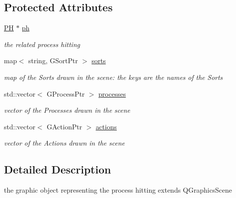 \subsection*{Protected Attributes}
\begin{DoxyCompactItemize}
\item 
\hypertarget{classPHScene_a332655cec4c6cca3153ffc3ee14eb465}{\hyperlink{classPH}{P\+H} $\ast$ \hyperlink{classPHScene_a332655cec4c6cca3153ffc3ee14eb465}{ph}}\label{classPHScene_a332655cec4c6cca3153ffc3ee14eb465}

\begin{DoxyCompactList}\small\item\em the related process hitting \end{DoxyCompactList}\item 
\hypertarget{classPHScene_a664d48bb0ae4f95df04e7a939855cae5}{map$<$ string, G\+Sort\+Ptr $>$ \hyperlink{classPHScene_a664d48bb0ae4f95df04e7a939855cae5}{sorts}}\label{classPHScene_a664d48bb0ae4f95df04e7a939855cae5}

\begin{DoxyCompactList}\small\item\em map of the Sorts drawn in the scene\+: the keys are the names of the Sorts \end{DoxyCompactList}\item 
\hypertarget{classPHScene_a392d190fc16531af5049727766582bed}{std\+::vector$<$ G\+Process\+Ptr $>$ \hyperlink{classPHScene_a392d190fc16531af5049727766582bed}{processes}}\label{classPHScene_a392d190fc16531af5049727766582bed}

\begin{DoxyCompactList}\small\item\em vector of the Processes drawn in the scene \end{DoxyCompactList}\item 
\hypertarget{classPHScene_a5802a1a674ffd883d3bf8403399365fb}{std\+::vector$<$ G\+Action\+Ptr $>$ \hyperlink{classPHScene_a5802a1a674ffd883d3bf8403399365fb}{actions}}\label{classPHScene_a5802a1a674ffd883d3bf8403399365fb}

\begin{DoxyCompactList}\small\item\em vector of the Actions drawn in the scene \end{DoxyCompactList}\end{DoxyCompactItemize}


\subsection{Detailed Description}
the graphic object representing the process hitting extends Q\+Graphics\+Scene 

